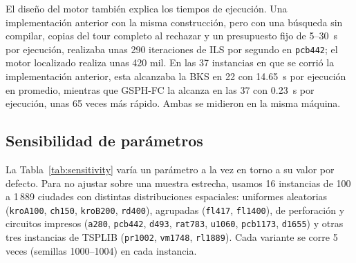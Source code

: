 \documentclass[runningheads]{llncs}
\begin{document}
El diseño del motor también explica los tiempos de ejecución. Una
implementación anterior con la misma construcción, pero con una búsqueda
sin compilar, copias del tour completo al rechazar y un presupuesto fijo
de 5--30~s por ejecución, realizaba unas 290 iteraciones de ILS por
segundo en \texttt{pcb442}; el motor localizado realiza unas 420 mil. En
las 37 instancias en que se corrió la implementación anterior, esta
alcanzaba la BKS en 22 con 14.65~s por ejecución en promedio, mientras
que GSPH-FC la alcanza en las 37 con 0.23~s por ejecución, unas 65 veces
más rápido. Ambas se midieron en la misma máquina.

\subsection{Sensibilidad de parámetros}
\label{sec:sensitivity}

La Tabla~\ref{tab:sensitivity} varía un parámetro a la vez en torno a su
valor por defecto. Para no ajustar sobre una muestra estrecha, usamos 16
instancias de 100 a 1\,889 ciudades con distintas distribuciones
espaciales: uniformes aleatorias (\texttt{kroA100}, \texttt{ch150},
\texttt{kroB200}, \texttt{rd400}), agrupadas (\texttt{fl417},
\texttt{fl1400}), de perforación y circuitos impresos (\texttt{a280},
\texttt{pcb442}, \texttt{d493}, \texttt{rat783}, \texttt{u1060},
\texttt{pcb1173}, \texttt{d1655}) y otras tres instancias de TSPLIB
(\texttt{pr1002}, \texttt{vm1748}, \texttt{rl1889}). Cada variante se
corre 5 veces (semillas 1000--1004) en cada instancia.
\end{document}
